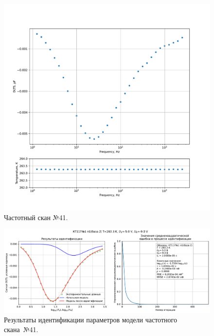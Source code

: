 \begin{figure}[!ht]
    \centering
    \includegraphics[width=1\textwidth]{../plots/КТ117№1_п1(база 2)_2500Гц-1Гц_1пФ_-10С_-5В-9В_100мВ_20мкс_шаг_0,1.pdf}
    \caption{Частотный скан №41.}
    \label{pic:frequency_scan_41}
\end{figure}

\begin{figure}[!ht]
    \centering
    \includegraphics[width=1\textwidth]{../plots/КТ117№1_п1(база 2)_2500Гц-1Гц_1пФ_-10С_-5В-9В_100мВ_20мкс_шаг_0,1_model.pdf}
    \caption{Результаты идентификации параметров модели частотного скана~№41.}
    \label{pic:frequency_scan_model41}
\end{figure}

\pagebreak


